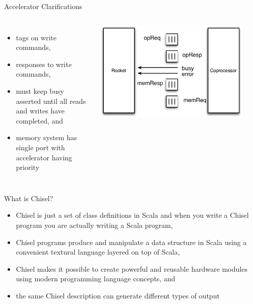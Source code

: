 \documentclass[xcolor=pdflatex,dvipsnames,table]{beamer}
\begin{document}
\begin{frame}[fragile]{Accelerator Clarifications}
\begin{columns}
\begin{itemize}
\item tags on write commands,
\item responses to write commands,
\item must keep busy asserted until all reads and writes have completed, and
\item memory system has single port with accelerator having priority
\end{itemize}
\begin{center}
\includegraphics[width=0.9\textwidth]{figs/rocket-coprocessor.pdf}
\end{center}
\end{columns}
\end{frame}

\begin{frame}[fragile]{What is Chisel?}
\begin{itemize}
\item Chisel is just a set of class definitions in Scala and
 when you write a Chisel program you are actually writing a Scala program,
\item Chisel programs produce and manipulate a data structure in Scala using a convenient textural language layered on top of Scala,
\item Chisel makes it possible to create powerful and reusable hardware modules using modern programming language concepts, and
\item the same Chisel description can generate different types of output
\end{itemize}
\end{frame}
\end{document}
